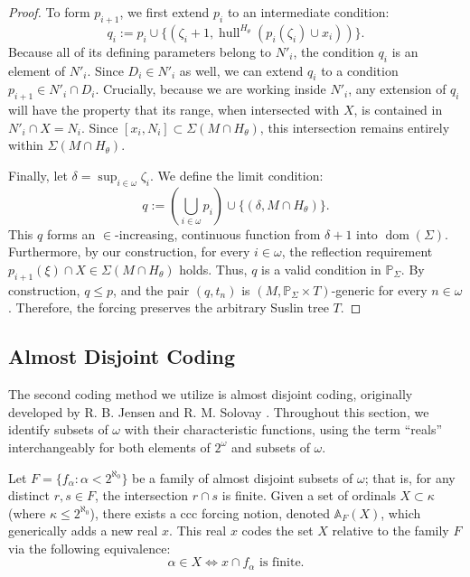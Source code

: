 \documentclass[a4paper,11pt]{article}
\newcommand{\forceP}{\mathbb{P}}
\begin{document}
\begin{proof}
To form $p_{i+1}$, we first extend $p_i$ to an intermediate condition:
$$q_i := p_i \cup \{( \zeta_i + 1, \operatorname{hull}^{H_{\theta}} (p_i(\zeta_i) \cup x_i)) \}.$$ 
Because all of its defining parameters belong to $N'_i$, the condition $q_i$ is an element of $N'_i$. Since $D_i \in N'_i$ as well, we can extend $q_i$ to a condition $p_{i+1} \in N'_i \cap D_i$. Crucially, because we are working inside $N'_i$, any extension of $q_i$ will have the property that its range, when intersected with $X$, is contained in $N'_i \cap X = N_i$. Since $[x_i, N_i] \subset \Sigma(M \cap H_{\theta})$, this intersection remains entirely within $\Sigma(M \cap H_{\theta})$.

Finally, let $\delta = \sup_{i \in \omega} \zeta_i$. We define the limit condition:
$$q := \left( \bigcup_{i \in \omega} p_i \right) \cup \{(\delta, M \cap H_{\theta})\}.$$ 
This $q$ forms an $\in$-increasing, continuous function from $\delta + 1$ into $\operatorname{dom}(\Sigma)$. Furthermore, by our construction, for every $i \in \omega$, the reflection requirement $p_{i+1}(\xi) \cap X \in \Sigma(M \cap H_{\theta})$ holds. Thus, $q$ is a valid condition in $\forceP_{\Sigma}$. By construction, $q \le p$, and the pair $(q,t_n)$ is $(M, \forceP_{\Sigma} \times T)$-generic for every $n \in \omega$. Therefore, the forcing preserves the arbitrary Suslin tree $T$.
\end{proof}




\subsection{Almost Disjoint Coding}

The second coding method we utilize is almost disjoint coding, originally developed by R. B. Jensen and R. M. Solovay \cite{JensenSolovay}. Throughout this section, we identify subsets of $\omega$ with their characteristic functions, using the term ``reals'' interchangeably for both elements of $2^{\omega}$ and subsets of $\omega$.

Let $F=\{f_{\alpha} : \alpha < 2^{\aleph_0}\}$ be a family of almost disjoint subsets of $\omega$; that is, for any distinct $r, s \in F$, the intersection $r \cap s$ is finite. Given a set of ordinals $X \subset \kappa$ (where $\kappa \le 2^{\aleph_0}$), there exists a ccc forcing notion, denoted $\mathbb{A}_F(X)$, which generically adds a new real $x$. This real $x$ codes the set $X$ relative to the family $F$ via the following equivalence:
$$\alpha \in X \iff x \cap f_{\alpha} \text{ is finite.}$$
\end{document}
